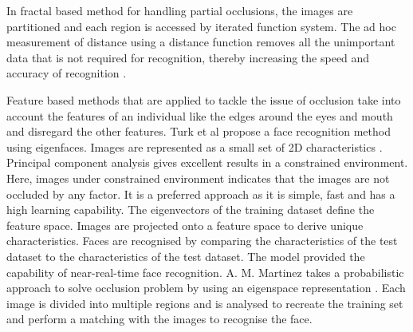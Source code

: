 \documentclass[conference]{IEEEtran}
\begin{document}
In fractal based method for handling partial occlusions, the images are partitioned and each region is accessed by iterated function system. The ad hoc measurement of distance using a distance function removes all the unimportant data that is not required for recognition, thereby increasing the speed and accuracy of recognition \cite{abate20072d}.

Feature based methods that are applied to tackle the issue of occlusion take into account the features of an individual like the edges around the eyes and mouth and disregard the other features. Turk et al propose a face recognition method using eigenfaces. Images are represented as a small set of 2D characteristics  \cite{turk1991face}. Principal component analysis gives excellent results in a constrained environment. Here, images under constrained environment indicates that the images are not occluded by any factor. It is a preferred approach as it is simple, fast and has a high learning capability. The eigenvectors of the training dataset define the  feature space. Images are projected onto a feature space to derive unique characteristics. Faces are recognised by comparing the characteristics of the test dataset to the characteristics of the test dataset. The model provided the  capability of near-real-time face recognition. A. M. Martinez takes a probabilistic approach to solve occlusion problem by using an eigenspace representation \cite{martinez2000recognition}. Each image is divided into multiple regions and is analysed to recreate the training set and perform a matching with the images to recognise the face.
\end{document}
